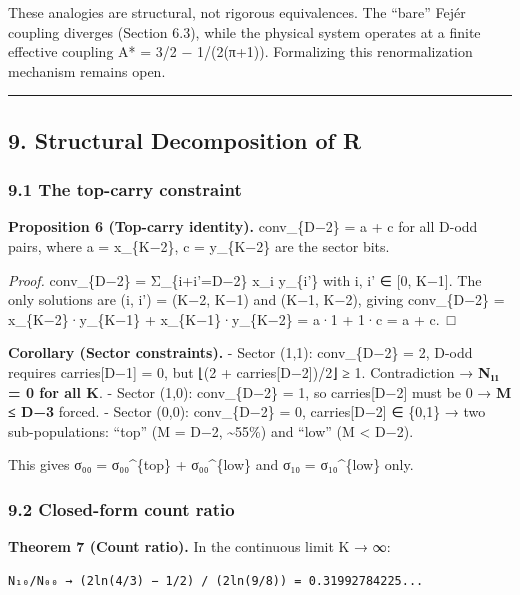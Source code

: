 \documentclass[
  11pt,
]{article}
\begin{document}
These analogies are structural, not rigorous equivalences. The ``bare'' Fejér
coupling diverges (Section 6.3), while the physical system operates at a finite
effective coupling A* = 3/2 − 1/(2(π+1)). Formalizing this renormalization
mechanism remains open.

\begin{center}\rule{0.5\linewidth}{0.5pt}\end{center}

\newpage

\subsection{9. Structural Decomposition of
R}\label{structural-decomposition-of-r}

\subsubsection{9.1 The top-carry constraint}\label{the-top-carry-constraint}

\textbf{Proposition 6 (Top-carry identity).} conv\_\{D−2\} = a + c for all D-odd
pairs, where a = x\_\{K−2\}, c = y\_\{K−2\} are the sector bits.

\emph{Proof.} conv\_\{D−2\} = Σ\_\{i+i'=D−2\} x\_i y\_\{i'\} with i, i' ∈ {[}0,
K−1{]}. The only solutions are (i, i') = (K−2, K−1) and (K−1, K−2), giving
conv\_\{D−2\} = x\_\{K−2\}·y\_\{K−1\} + x\_\{K−1\}·y\_\{K−2\} = a·1 + 1·c = a +
c.~□

\textbf{Corollary (Sector constraints).} - Sector (1,1): conv\_\{D−2\} = 2,
D-odd requires carries{[}D−1{]} = 0, but ⌊(2 + carries{[}D−2{]})/2⌋ ≥ 1.
Contradiction → \textbf{N₁₁ = 0 for all K}. - Sector (1,0): conv\_\{D−2\} = 1,
so carries{[}D−2{]} must be 0 → \textbf{M ≤ D−3} forced. - Sector (0,0):
conv\_\{D−2\} = 0, carries{[}D−2{]} ∈ \{0,1\} → two sub-populations: ``top'' (M
= D−2, \textasciitilde55\%) and ``low'' (M \textless{} D−2).

This gives σ₀₀ = σ₀₀\^{}\{top\} + σ₀₀\^{}\{low\} and σ₁₀ = σ₁₀\^{}\{low\} only.

\subsubsection{9.2 Closed-form count ratio}\label{closed-form-count-ratio}

\textbf{Theorem 7 (Count ratio).} In the continuous limit K → ∞:

\begin{verbatim}
N₁₀/N₀₀ → (2ln(4/3) − 1/2) / (2ln(9/8)) = 0.31992784225...
\end{verbatim}
\end{document}
